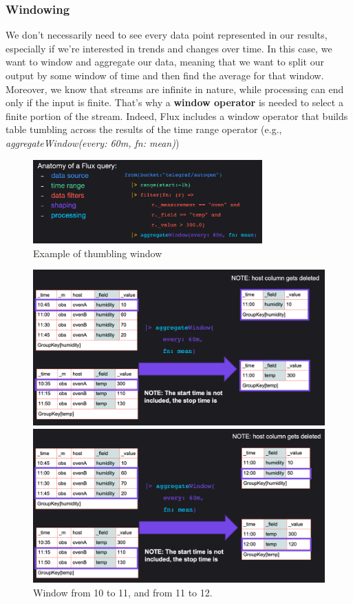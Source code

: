 \documentclass[10pt,a4paper]{article}
\begin{document}
 \subsubsection{Windowing}
 We don’t necessarily need to see every data point represented in our results, especially if we’re interested in trends and changes over time. In this case, we want to window and aggregate our data, meaning that we want to split our output by some window of time and then find the average for that window. \\
 Moreover, we know that streams are infinite in nature, while processing can end only if the input is finite. That's why a \textbf{window operator} is needed to select a finite portion of the stream. Indeed, Flux includes a window operator that builds table tumbling across the results of the time range operator (e.g., \textit{ aggregateWindow(every: 60m, fn: mean)})
       \begin{figure}[ht!]
 \hfill \includegraphics[width=250pt]{images/flux-window}
 \hspace*{\fill}
 \caption{Example of thumbling window}
 \end{figure}
    \begin{figure}[ht!]
\begin{minipage}{.5\textwidth}
  \centering
  \includegraphics[width=.8\linewidth]{images/flux-window-ex1}
\end{minipage}%
\begin{minipage}{.5\textwidth}
  \centering
  \includegraphics[width=.8\linewidth]{images/flux-window-ex2}
\end{minipage}
\caption{Window from 10 to 11, and from 11 to 12.}
\end{figure}
\pagebreak
\end{document}
